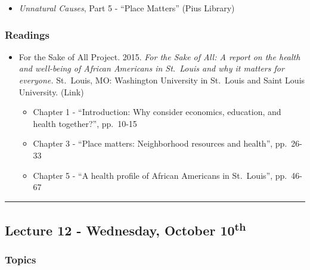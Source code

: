 \documentclass[]{book}
\providecommand{\tightlist}{%
  \setlength{\itemsep}{0pt}\setlength{\parskip}{0pt}}
\theoremstyle{definition}
\theoremstyle{definition}
\theoremstyle{definition}
\theoremstyle{remark}
\begin{document}
\begin{itemize}
\tightlist
\item
  \emph{Unnatural Causes}, Part 5 - ``Place Matters'' (Pius Library)
\end{itemize}

\hypertarget{readings-11}{%
\subsubsection*{Readings}\label{readings-11}}

\begin{itemize}
\tightlist
\item
  For the Sake of All Project. 2015. \emph{For the Sake of All: A report
  on the health and well-being of African Americans in St.~Louis and why
  it matters for everyone.} St.~Louis, MO: Washington University in
  St.~Louis and Saint Louis University. (Link)

  \begin{itemize}
  \tightlist
  \item
    Chapter 1 - ``Introduction: Why consider economics, education, and
    health together?'', pp.~10-15
  \item
    Chapter 3 - ``Place matters: Neighborhood resources and health'',
    pp.~26-33
  \item
    Chapter 5 - ``A health profile of African Americans in St.~Louis'',
    pp.~46-67
  \end{itemize}
\end{itemize}

\begin{center}\rule{0.5\linewidth}{\linethickness}\end{center}

\hypertarget{lecture-12---wednesday-october-10th}{%
\subsection*{\texorpdfstring{Lecture 12 - Wednesday, October
10\textsuperscript{th}}{Lecture 12 - Wednesday, October 10th}}\label{lecture-12---wednesday-october-10th}}

\hypertarget{topics-13}{%
\subsubsection*{Topics}\label{topics-13}}
\end{document}

